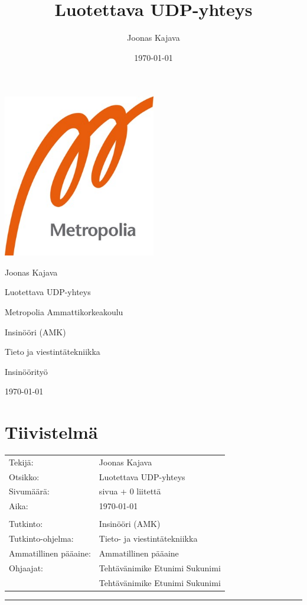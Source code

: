 \documentclass[a4paper,12pt]{article}
\title{Luotettava UDP-yhteys}
\author{Joonas Kajava}
\date{\today}
\newcommand{\me}{Joonas Kajava}
\renewcommand{\title}{Luotettava UDP-yhteys}
\newcommand{\appendixCount}{0}
\newcommand{\pageCount}{ \pageref{LastPage}}
\newcommand*\sepline{
    \begin{center}
        \rule[1ex]{\textwidth}{.5pt}
    \end{center}}
\begin{document}
    \begin{titlepage}
        \includegraphics[width=0.5\textwidth]{images/metropolia}\par\vspace{2cm}
        {\Large \me}\par \vspace{1cm}

        {\Huge \title}\par \vspace{1cm}

        \vfill

        Metropolia Ammattikorkeakoulu\par
        Insinööri (AMK)\par
        Tieto ja viestintätekniikka\par
        Insinöörityö\par
        \today

        \newpage
        \thispagestyle{empty}

        \section*{Tiivistelmä}

        \begin{tabular} {l l}
            Tekijä:               & \me                                            \\
            Otsikko:              & \title                                         \\
            Sivumäärä:            & \pageCount{} sivua + \appendixCount{} liitettä \\
            Aika:                 & \today                                         \\
            \\
            Tutkinto: & Insinööri (AMK) \\
            Tutkinto-ohjelma: & Tieto- ja viestintätekniikka \\
            Ammatillinen pääaine: & Ammatillinen pääaine \\
            Ohjaajat: & Tehtävänimike Etunimi Sukunimi                      \\
            & Tehtävänimike Etunimi Sukunimi \\
        \end{tabular}
        \sepline
        \newpage
        \thispagestyle{empty}



\end{titlepage}
\end{document}
